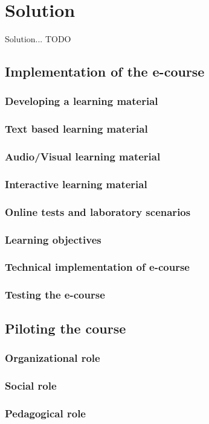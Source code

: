 \chapter{Solution}
\label{solution}
Solution...{\color{red} TODO }

\section{Implementation of the e-course}

\subsection{Developing a learning material}
\subsection{Text based learning material}
\subsection{Audio/Visual learning material}
\subsection{Interactive learning material}
\subsection{Online tests and laboratory scenarios}
\subsection{Learning objectives}
\subsection{Technical implementation of e-course}
\subsection{Testing the e-course}
\section{Piloting the course}
\subsection{Organizational role}
\subsection{Social role}
\subsection{Pedagogical role}